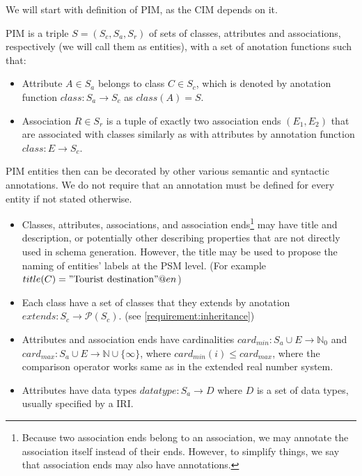 \bigskip

We will start with definition of PIM, as the CIM depends on it.

\begin{definition}[PIM] PIM is a triple $S=(S_c, S_a, S_r)$ of sets of classes, attributes and associations, respectively (we will call them as entities), with a set of anotation functions such that:
    \begin{itemize}
        \item Attribute $A \in S_a$ belongs to class $C \in S_c$, which is denoted by anotation function ${class}: S_a \rightarrow S_c$ as ${class}(A)=S$.
        \item Association $R \in S_r$ is a tuple of exactly two association ends $(E_1, E_2)$ that are associated with classes similarly as with attributes by annotation function ${class}: E \rightarrow S_c$.
    \end{itemize}

    PIM entities then can be decorated by other various semantic and syntactic annotations. We do not require that an annotation must be defined for every entity if not stated otherwise.

    \begin{itemize}
        \item Classes, attributes, associations, and association ends\footnote{Because two association ends belong to an association, we may annotate the association itself instead of their ends. However, to simplify things, we say that association ends may also have annotations.} may have title and description, or potentially other describing properties that are not directly used in schema generation. However, the title may be used to propose the naming of entities' labels at the PSM level. (For example $title(C)="\textrm{Tourist destination}"@en$)
        \item Each class have a set of classes that they extends by anotation $extends: S_c \rightarrow \mathcal{P}(S_c)$. (see \autoref{requirement:inheritance})
        \item Attributes and association ends have cardinalities $card_{min}: S_a \cup E \rightarrow \mathds{N}_0$ and $card_{max}: S_a \cup E \rightarrow \mathds{N} \cup \{\infty\}$, where $card_{min}(i) \leq card_{max}$, where the comparison operator works same as in the extended real number system.
        \item Attributes have data types $datatype: S_a \rightarrow D$ where $D$ is a set of data types, usually specified by a IRI.
    \end{itemize}
\end{definition}

